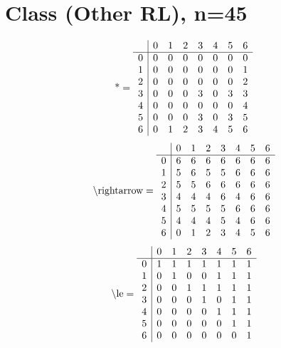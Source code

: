 \documentclass[11pt]{article}
\begin{document}
\section{Class (Other RL), n=45}
\[\text{*} = 
\begin{array}{r | r r r r r r r}
 & 0 & 1 & 2 & 3 & 4 & 5 & 6 \\ \hline
0 & 0 & 0 & 0 & 0 & 0 & 0 & 0 \\
1 & 0 & 0 & 0 & 0 & 0 & 0 & 1 \\
2 & 0 & 0 & 0 & 0 & 0 & 0 & 2 \\
3 & 0 & 0 & 0 & 3 & 0 & 3 & 3 \\
4 & 0 & 0 & 0 & 0 & 0 & 0 & 4 \\
5 & 0 & 0 & 0 & 3 & 0 & 3 & 5 \\
6 & 0 & 1 & 2 & 3 & 4 & 5 & 6 \\
\end{array}
\]
\[\text{\textbackslash rightarrow} = 
\begin{array}{r | r r r r r r r}
 & 0 & 1 & 2 & 3 & 4 & 5 & 6 \\ \hline
0 & 6 & 6 & 6 & 6 & 6 & 6 & 6 \\
1 & 5 & 6 & 5 & 5 & 6 & 6 & 6 \\
2 & 5 & 5 & 6 & 6 & 6 & 6 & 6 \\
3 & 4 & 4 & 4 & 6 & 4 & 6 & 6 \\
4 & 5 & 5 & 5 & 5 & 6 & 6 & 6 \\
5 & 4 & 4 & 4 & 5 & 4 & 6 & 6 \\
6 & 0 & 1 & 2 & 3 & 4 & 5 & 6 \\
\end{array}
\]
\[\text{\textbackslash le} = 
\begin{array}{r | r r r r r r r}
 & 0 & 1 & 2 & 3 & 4 & 5 & 6 \\ \hline
0 & 1 & 1 & 1 & 1 & 1 & 1 & 1 \\
1 & 0 & 1 & 0 & 0 & 1 & 1 & 1 \\
2 & 0 & 0 & 1 & 1 & 1 & 1 & 1 \\
3 & 0 & 0 & 0 & 1 & 0 & 1 & 1 \\
4 & 0 & 0 & 0 & 0 & 1 & 1 & 1 \\
5 & 0 & 0 & 0 & 0 & 0 & 1 & 1 \\
6 & 0 & 0 & 0 & 0 & 0 & 0 & 1 \\
\end{array}
\]
\end{document}
